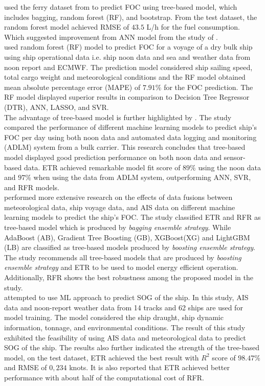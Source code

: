  used the ferry dataset from  to predict FOC using tree-based model, which includes bagging, random forest (RF), and bootstrap. From the test dataset, the random forest model achieved RMSE of $43.5$ L/h for the fuel consumption. Which suggested improvement from ANN model from the study of .\\ 

 used random forest (RF) model to predict FOC for a voyage of a dry bulk ship using ship operational data i.e. ship noon data and sea and weather data from noon report and ECMWF. The prediction model considered ship sailing speed, total cargo weight and meteorological conditions and the RF model obtained mean absolute percentage error (MAPE) of $7.91\%$ for the FOC prediction. The RF model displayed superior results in comparison to Decision Tree Regressor (DTR), ANN, LASSO, and SVR.\\      

The advantage of tree-based model is further highlighted by . The study compared the performance of different machine learning models to predict ship's FOC per day using both noon data and automated data logging and monitoring (ADLM) system from a bulk carrier. This research concludes that tree-based model displayed good prediction performance on both noon data and sensor-based data. ETR achieved remarkable model fit score of $89\%$ using the noon data and $97\%$ when using the data from ADLM system, outperforming ANN, SVR, and RFR models.\\

 performed more extensive research on the effects of data fusions between meteorological data, ship voyage data, and AIS data on different machine learning models to predict the ship's FOC. The study classified ETR and RFR as tree-based model which is produced by \emph{bagging ensemble strategy}. While AdaBoost (AB), Gradient Tree Boosting (GB), XGBoost(XG) and LightGBM (LB) are classified as tree-based models produced by \emph{boosting ensemble strategy}. The study recommends all tree-based models that are produced by \emph{boosting ensemble strategy} and ETR to be used to model energy efficient operation. Additionally, RFR shows the best robustness among the proposed model in the study.\\

 attempted to use ML approach to predict SOG of the ship. In this study, AIS data and noon-report weather data from 14 tracks and 62 ships are used for model training. The model considered the ship draught, ship dynamic information, tonnage, and environmental conditions. The result of this study exhibited the feasibility of using AIS data and meteorological data to predict SOG of the ship. The results also further indicated the strength of the tree-based model, on the test dataset, ETR achieved the best result with $R^2$ score of $98.47\%$ and RMSE of $0,234$ knots. It is also reported that ETR achieved better performance with about half of the computational cost of RFR.\\ 

